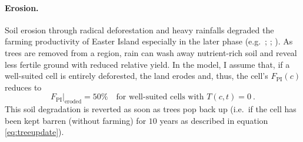 
\paragraph{Erosion.}
Soil erosion through radical deforestation and heavy rainfalls degraded the farming productivity of Easter Island especially in the later phase (e.g.\ ; ; ).
As trees are removed from a region, rain can wash away nutrient-rich soil and reveal less fertile ground with reduced relative yield. %
In the model, I assume that, if a well-suited cell is entirely deforested, the land erodes and, thus, the cell's $F_\text{PI}(c)$ reduces to 
\begin{equation}
F_\text{PI}|_\text{eroded}=50\% \quad \text{for well-suited cells with } T(c,t)=0 \ .
\end{equation}
This soil degradation is reverted as soon as trees pop back up (i.e.\ if the cell has been kept barren (without farming) for $10$ years as described in equation \ref{eq:treeupdate}).


